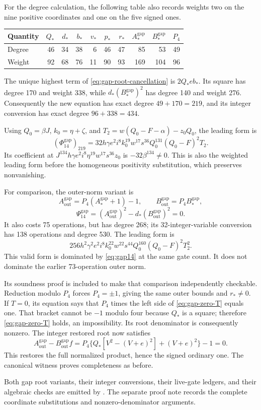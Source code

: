 For the degree calculation, the following table also records weights
two on the nine positive coordinates and one on the five signed ones.
\begin{center}
\begin{tabular}{lrrrrrrrrr}
\toprule
Quantity & \(Q_*\)&\(d_*\)&\(b_*\)&\(v_*\)&\(p_*\)&\(r_*\)
 &\(A_*^{\mathrm{gap}}\)&\(B_*^{\mathrm{gap}}\)&\(P_4\)\\
\midrule
Degree &46&34&38&6&46&47&85&53&49\\
Weight &92&68&76&11&90&93&169&104&96\\
\bottomrule
\end{tabular}
\end{center}
The unique highest term of \eqref{eq:gap-root-cancellation} is
\(2Q_*eb_*\). Its square has degree 170 and weight 338, while
\(d_*(B_*^{\mathrm{gap}})^2\) has degree 140 and weight 276.
Consequently the new equation has exact degree \(49+170=219\),
and its integer conversion has exact degree \(96+338=434\).

Using \(Q_0=\beta J\), \(k_0=\eta+\zeta\), and
\(T_2=w(Q_0-F-\alpha)-z_0Q_0\), the leading form is
\begin{equation}
 (\Phi_{14}^{\mathrm{gap}})_{219}
   =32h\gamma e^2i^8k_0^{19}w^{17}s^{36}
       Q_0^{131}(Q_0-F)^2T_2.
 \label{eq:gap-root-leader}
\end{equation}
Its coefficient at
\(J^{134}h\gamma e^2i^8\eta^{19}w^{17}s^{36}z_0\)
is \(-32\beta^{134}\ne0\). This is also the weighted leading form
before the homogeneous positivity substitution, which preserves
nonvanishing.

For comparison, the outer-norm variant is
\[
 A_{\mathrm{out}}^{\mathrm{gap}}
   =P_4(A_*^{\mathrm{gap}}+1)-1,
 \qquad
 B_{\mathrm{out}}^{\mathrm{gap}}=P_4B_*^{\mathrm{gap}},
\]
\[
 \Psi_{14}^{\mathrm{gap}}
   =(A_{\mathrm{out}}^{\mathrm{gap}})^2
      -d_*(B_{\mathrm{out}}^{\mathrm{gap}})^2=0.
\]
It also costs 75 operations, but has degree 268; its 32-integer-variable
conversion has 138 operations and degree 530. The leading form is
\[
 256h^2\gamma^2e^2i^8k_0^{22}w^{22}s^{44}
       Q_0^{160}(Q_0-F)^2T_2^2.
\]
This valid form is dominated by \eqref{eq:gap14} at the same gate
count. It does not dominate the earlier 73-operation outer norm.

Its soundness proof is included to make that comparison independently
checkable. Reduction modulo \(P_4\) forces \(P_4=\pm1\), giving
the same outer bounds and \(r_*\ne0\). If \(T=0\), its equation says
that \(P_4\) times the left side of \eqref{eq:gap-zero-T} equals one.
That bracket cannot be \(-1\) modulo four because \(Q_*\) is a square;
therefore \eqref{eq:gap-zero-T} holds, an impossibility. Its root
denominator is consequently nonzero. The integer restored root now
satisfies
\[
 A_{\mathrm{out}}^{\mathrm{gap}}
    -B_{\mathrm{out}}^{\mathrm{gap}}f
  =P_4\bigl\{Q_*[V^2-(V+e)^2]+(V+e)^2\bigr\}-1=0.
\]
This restores the full normalized product, hence the signed ordinary
one. The canonical witness proves completeness as before.

Both gap root variants, their integer conversions, their live-gate
ledgers, and their algebraic checks are emitted by
. The separate proof note records the
complete coordinate substitutions and nonzero-denominator arguments.
